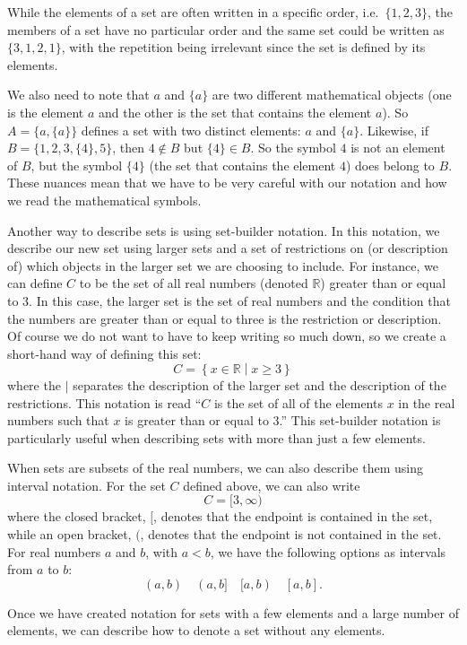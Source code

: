 \documentclass[
]{book}
\theoremstyle{definition}
\theoremstyle{definition}
\theoremstyle{definition}
\theoremstyle{definition}
\theoremstyle{remark}
\begin{document}
While the elements of a set are often written in a specific order, i.e.~\(\{1,2,3\}\), the members of a set have no particular order and the same set could be written as \(\{3, 1, 2, 1\}\), with the repetition being irrelevant since the set is defined by its elements.

We also need to note that \(a\) and \(\{a\}\) are two different mathematical objects (one is the element \(a\) and the other is the set that contains the element \(a\)). So \(A = \{a, \{a\}\}\) defines a set with two distinct elements: \(a\) and \(\{a\}\). Likewise, if \(B=\{1, 2, 3, \{4\}, 5\}\), then \(4\notin B\) but \(\{4\}\in B\). So the symbol \(4\) is not an element of \(B\), but the symbol \(\{4\}\) (the set that contains the element \(4\)) does belong to \(B\). These nuances mean that we have to be very careful with our notation and how we read the mathematical symbols.

Another way to describe sets is using set-builder notation. In this notation, we describe our new set using larger sets and a set of restrictions on (or description of) which objects in the larger set we are choosing to include. For instance, we can define \(C\) to be the set of all real numbers (denoted \(\mathbb{R}\)) greater than or equal to \(3\). In this case, the larger set is the set of real numbers and the condition that the numbers are greater than or equal to three is the restriction or description. Of course we do not want to have to keep writing so much down, so we create a short-hand way of defining this set:
\[ C = \left\{ x\in \mathbb{R} \middle \vert x\geq 3\right\}\] where the \(\vert\) separates the description of the larger set and the description of the restrictions. This notation is read ``\(C\) is the set of all of the elements \(x\) in the real numbers such that \(x\) is greater than or equal to 3.'' This set-builder notation is particularly useful when describing sets with more than just a few elements.

When sets are subsets of the real numbers, we can also describe them using interval notation. For the set \(C\) defined above, we can also write
\[C=[3,\infty)\] where the closed bracket, \([\), denotes that the endpoint is contained in the set, while an open bracket, \((\), denotes that the endpoint is not contained in the set. For real numbers \(a\) and \(b\), with \(a<b\), we have the following options as intervals from \(a\) to \(b\):
\[ (a,b) \quad (a,b] \quad [a,b) \quad [a,b] .\]

Once we have created notation for sets with a few elements and a large number of elements, we can describe how to denote a set without any elements.
\end{document}
